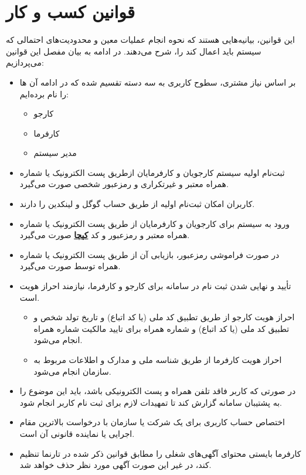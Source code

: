 \documentclass[12pt]{article}
\begin{document}
	\newpage

	\section{قوانین کسب و کار}
	این قوانین، بیانیه‌هایی هستند که نحوه انجام عملیات معین و محدودیت‌های احتمالی که سیستم باید اعمال کند را، شرح می‌دهند. در ادامه به بیان مفصل این قوانین می‌پردازیم:
	\begin{itemize}
		\item
		بر اساس نیاز مشتری، سطوح کاربری به سه دسته تقسیم شده که در ادامه آن ها را نام برده‌ایم:
		\begin{itemize}
			\item
			کارجو
			\item
			کارفرما
			\item
			مدیر سیستم
		\end{itemize}
		\item
		ثبت‌نام اولیه سیستم کارجویان و کارفرمایان از‌طریق پست الکترونیک یا شماره همراه معتبر و غیر‌تکراری و رمز‌عبور شخصی صورت می‌گیرد.
		\item
		کاربران امکان ثبت‌نام اولیه از طریق حساب گوگل و لینکدین را دارند.
		\item
		ورود به سیستم برای کارجویان و کارفرمایان از طر‌یق پست الکترونیک یا شماره همراه معتبر و رمز‌عبور و کد \textbf{\hyperref[ref:captcha]{کپچا}} صورت می‌گیرد.
		\item
		در‌ صورت فراموشی رمز‌عبور، بازیابی آن از طریق پست الکترونیک یا شماره همراه توسط صورت می‌گیرد.
		\item
		تأیید و نهایی شدن ثبت نام در سامانه برای کارجو و کارفرما، نیازمند احراز هویت است.
		\begin{itemize}
			\item
			احراز هویت کارجو از طریق تطبیق کد ملی (یا کد اتباع) و تاریخ تولد شخص و تطبیق کد ملی (یا کد اتباع) و شماره همراه برای تایید مالکیت شماره همراه انجام می‌شود.
			\item
			احراز هویت کارفرما از طریق شناسه ملی و مدارک و اطلاعات مربوط به سازمان انجام می‌شود.
		\end{itemize}
		\item
		در ‌صورتی که کاربر فاقد تلفن همراه و پست الکترونیکی باشد، باید این موضوع را به پشتیبان سامانه گزارش کند تا تمهیدات لازم برای ثبت نام کاربر انجام شود.
		\item
		اختصاص حساب کاربری برای یک شرکت یا سازمان با درخواست بالاترین مقام اجرایی یا نماینده قانونی آن است.
		\item
		کارفرما بایستی محتوای آگهی‌های شغلی را مطابق قوانین ذکر شده در تارنما تنظیم کند، در غیر‌ این صورت آگهی مورد نظر حذف خواهد شد.

\end{itemize}
\end{document}
